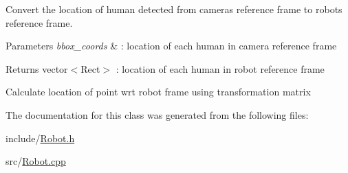 Convert the location of human detected from camera\textquotesingle{}s reference frame to robot\textquotesingle{}s reference frame. 


\begin{DoxyParams}{Parameters}
{\em bbox\+\_\+coords} & \+: location of each human in camera reference frame \\
\hline
\end{DoxyParams}
\begin{DoxyReturn}{Returns}
vector$<$\+Rect$>$ \+: location of each human in robot reference frame 
\end{DoxyReturn}
Calculate location of point wrt robot frame using transformation matrix

The documentation for this class was generated from the following files\+:\begin{DoxyCompactItemize}
\item 
include/\hyperlink{Robot_8h}{Robot.\+h}\item 
src/\hyperlink{Robot_8cpp}{Robot.\+cpp}\end{DoxyCompactItemize}
